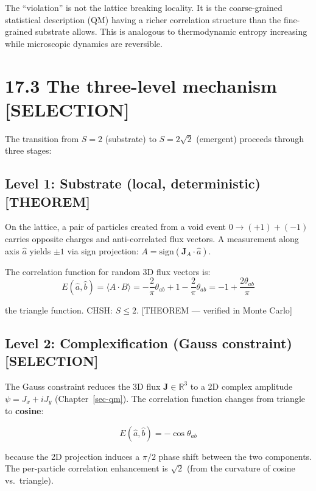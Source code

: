 \documentclass[
  11pt,
  letterpaper,
  twoside,
  openright]{book}
\begin{document}
The ``violation'' is not the lattice breaking locality. It is the
coarse-grained statistical description (QM) having a richer correlation
structure than the fine-grained substrate allows. This is analogous to
thermodynamic entropy increasing while microscopic dynamics are
reversible.

\section{17.3 The three-level mechanism
{[}SELECTION{]}}\label{the-three-level-mechanism-selection}

The transition from \(S = 2\) (substrate) to \(S = 2\sqrt{2}\)
(emergent) proceeds through three stages:

\subsection{Level 1: Substrate (local, deterministic)
{[}THEOREM{]}}\label{level-1-substrate-local-deterministic-theorem}

On the lattice, a pair of particles created from a void event
\(0 \to (+1) + (-1)\) carries opposite charges and anti-correlated flux
vectors. A measurement along axis \(\hat{a}\) yields \(\pm 1\) via sign
projection: \(A = \text{sign}(\mathbf{J}_A \cdot \hat{a})\).

The correlation function for random 3D flux vectors is: \[
E(\hat{a}, \hat{b}) = \langle A \cdot B \rangle = -\frac{2}{\pi}\theta_{ab} + 1 - \frac{2}{\pi}\theta_{ab} = -1 + \frac{2\theta_{ab}}{\pi}
\tag{17.1}
\]

the triangle function. CHSH: \(S \leq 2\). {[}THEOREM --- verified in
Monte Carlo{]}

\subsection{Level 2: Complexification (Gauss constraint)
{[}SELECTION{]}}\label{level-2-complexification-gauss-constraint-selection}

The Gauss constraint reduces the 3D flux \(\mathbf{J} \in \mathbb{R}^3\)
to a 2D complex amplitude \(\psi = J_x + iJ_y\) (Chapter~\ref{sec-qm}).
The correlation function changes from triangle to \textbf{cosine}:

\[
E(\hat{a}, \hat{b}) = -\cos\theta_{ab}
\tag{17.2}
\]

because the 2D projection induces a \(\pi/2\) phase shift between the
two components. The per-particle correlation enhancement is \(\sqrt{2}\)
(from the curvature of cosine vs.~triangle).
\end{document}
